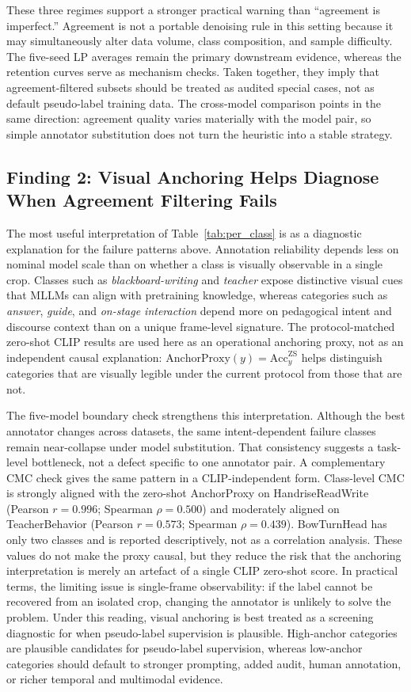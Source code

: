 \documentclass{ieeeaccess}
\begin{document}
These three regimes support a stronger practical warning than
``agreement is imperfect.''
Agreement is not a portable denoising rule in this setting because it
may simultaneously alter data volume, class composition, and sample
difficulty.
The five-seed LP averages remain the primary downstream evidence,
whereas the retention curves serve as mechanism checks.
Taken together, they imply that agreement-filtered subsets should be
treated as audited special cases, not as default pseudo-label training
data.
The cross-model comparison points in the same direction:
agreement quality varies materially with the model pair, so simple
annotator substitution does not turn the heuristic into a stable
strategy.

\subsection{Finding 2: Visual Anchoring Helps Diagnose When Agreement
Filtering Fails}

The most useful interpretation of Table~\ref{tab:per_class} is as a
diagnostic explanation for the failure patterns above.
Annotation reliability depends less on nominal model scale than on
whether a class is visually observable in a single crop.
Classes such as \textit{blackboard-writing} and \textit{teacher}
expose distinctive visual cues that MLLMs can align with pretraining
knowledge, whereas categories such as \textit{answer}, \textit{guide},
and \textit{on-stage interaction} depend more on pedagogical intent and
discourse context than on a unique frame-level signature.
The protocol-matched zero-shot CLIP results are used here as
an operational anchoring proxy, not as an independent causal
explanation: $\mathrm{AnchorProxy}(y)=\mathrm{Acc}^{\mathrm{ZS}}_{y}$
helps distinguish categories that are visually legible under the
current protocol from those that are not.

The five-model boundary check strengthens this interpretation.
Although the best annotator changes across datasets, the same
intent-dependent failure classes remain near-collapse under model
substitution.
That consistency suggests a task-level bottleneck, not a defect
specific to one annotator pair.
A complementary CMC check gives the same pattern in a CLIP-independent
form. Class-level CMC is strongly aligned with the zero-shot
AnchorProxy on HandriseReadWrite (Pearson $r=0.996$; Spearman
$\rho=0.500$) and moderately aligned on TeacherBehavior (Pearson
$r=0.573$; Spearman $\rho=0.439$). BowTurnHead has only two classes and
is reported descriptively, not as a correlation
analysis. These values do not make the proxy causal, but they reduce
the risk that the anchoring interpretation is merely an artefact of a
single CLIP zero-shot score.
In practical terms, the limiting issue is single-frame observability:
if the label cannot be recovered from an isolated crop, changing the
annotator is unlikely to solve the problem.
Under this reading, visual anchoring is best treated as a screening
diagnostic for when pseudo-label supervision is plausible.
High-anchor categories are plausible candidates for pseudo-label
supervision, whereas low-anchor categories should default to stronger
prompting, added audit, human annotation, or richer temporal and
multimodal evidence.
\end{document}
